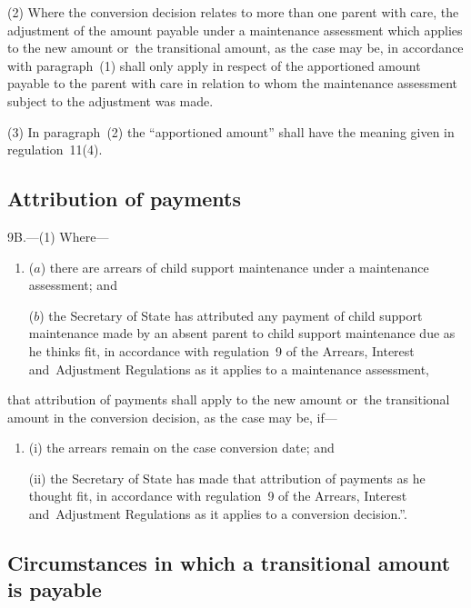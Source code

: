 \documentclass[12pt,a4paper]{article}
\begin{document}
(2) Where the conversion decision relates to more than one parent with care, the adjustment of the amount payable under a maintenance assessment which applies to the new amount or~the transitional amount, as the case may be, in accordance with paragraph~(1) shall only apply in respect of the apportioned amount payable to the parent with care in relation to whom the maintenance assessment subject to the adjustment was made.

(3) In paragraph~(2) the “apportioned amount” shall have the meaning given in regulation~11(4).


\subsection[9B. Attribution of payments]{Attribution of payments}

9B.---(1)  Where—
\begin{enumerate}\item[]
($a$) there are arrears of child support maintenance under a maintenance assessment; and

($b$) the Secretary of State has attributed any payment of child support maintenance made by an absent parent to child support maintenance due as he thinks fit, in accordance with regulation~9 of the Arrears, Interest and~Adjustment Regulations as it applies to a maintenance assessment,
\end{enumerate}
that attribution of payments shall apply to the new amount or~the transitional amount in the conversion decision, as the case may be, if—
\begin{enumerate}\item[]
(i) the arrears remain on the case conversion date; and

(ii) the Secretary of State has made that attribution of payments as he thought fit, in accordance with regulation~9 of the Arrears, Interest and~Adjustment Regulations as it applies to a conversion decision.”.
\end{enumerate}


\subsection[10. Circumstances in which a transitional amount is payable]{Circumstances in which a transitional amount is payable}
\end{document}

